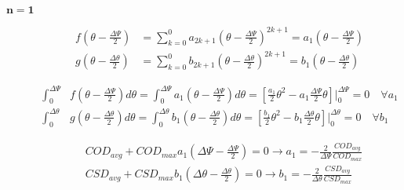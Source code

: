 \documentclass[review]{elsarticle}
\begin{document}
\begin{description}
\item[$\mathbf{n=1}$]

\begin{equation}
\begin{aligned}
f\left(\theta-\frac{\Delta\Psi}{2}\right)&=\sum_{k=0}^{0}a_{2k+1}\left(\theta-\frac{\Delta\Psi}{2}\right)^{2k+1}=a_{1}\left(\theta-\frac{\Delta\Psi}{2}\right)\\
g\left(\theta-\frac{\Delta\theta}{2}\right)&=\sum_{k=0}^{0}b_{2k+1}\left(\theta-\frac{\Delta\theta}{2}\right)^{2k+1}=b_{1}\left(\theta-\frac{\Delta\theta}{2}\right)
\end{aligned}
\end{equation}

\begin{equation}
\begin{aligned}
\int_{0}^{\Delta\Psi}&f\left(\theta-\frac{\Delta\Psi}{2}\right)d\theta=\int_{0}^{\Delta\Psi}a_{1}\left(\theta-\frac{\Delta\Psi}{2}\right) d\theta=\left[\frac{a_{1}}{2}\theta^{2}-a_{1}\frac{\Delta\Psi}{2}\theta\right]\Bigg\rvert_{0}^{\Delta\Psi}=0\quad\forall a_{1}\\
\int_{0}^{\Delta\theta}&g\left(\theta-\frac{\Delta\theta}{2}\right)d\theta=\int_{0}^{\Delta\theta}b_{1}\left(\theta-\frac{\Delta\theta}{2}\right) d\theta=\left[\frac{b_{1}}{2}\theta^{2}-b_{1}\frac{\Delta\theta}{2}\theta\right]\Bigg\rvert_{0}^{\Delta\theta}=0\quad\forall b_{1}
\end{aligned}
\end{equation}

\begin{equation}
\begin{aligned}
&COD_{avg}+COD_{max}a_{1}\left(\Delta\Psi-\frac{\Delta\Psi}{2}\right)=0\rightarrow a_{1}=-\frac{2}{\Delta\Psi}\frac{COD_{avg}}{COD_{max}}\\
&CSD_{avg}+CSD_{max}b_{1}\left(\Delta\theta-\frac{\Delta\theta}{2}\right)=0\rightarrow b_{1}=-\frac{2}{\Delta\theta}\frac{CSD_{avg}}{CSD_{max}}
\end{aligned}
\end{equation}


\end{description}
\end{document}
